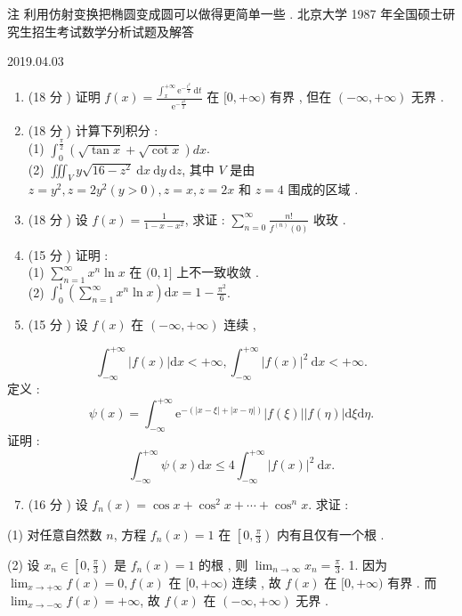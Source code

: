 \documentclass[10pt]{article}
\begin{document}
 注   利用仿射变换把椭圆变成圆可以做得更简单一些 .  北京大学  1987  年全国硕士研究生招生考试数学分析试题及解答 

   

2019.04.03

\begin{enumerate}
  \item (18  分 )  证明  $f(x)=\frac{\int_{x}^{+\infty} \mathrm{e}^{-\frac{t^{2}}{2}} \mathrm{~d} t}{\mathrm{e}^{-\frac{x^{2}}{2}}}$  在  $[0,+\infty)$  有界 ,  但在  $(-\infty,+\infty)$  无界 .

  \item (18  分 )  计算下列积分 :\\
(1) $\int_{0}^{\frac{\pi}{2}}(\sqrt{\tan x}+\sqrt{\cot x}) d x$.\\
(2) $\iiint_{V} y \sqrt{16-z^{2}} \mathrm{~d} x \mathrm{~d} y \mathrm{~d} z$,  其中  $V$  是由  $z=y^{2}, z=2 y^{2}(y>0), z=x, z=2 x$  和  $z=4$  围成的区域 .

  \item (18  分 )  设  $f(x)=\frac{1}{1-x-x^{2}}$,  求证 : $\sum_{n=0}^{\infty} \frac{n !}{f^{(n)}(0)}$  收玫 .

  \item (15  分 )  证明 :\\
(1) $\sum_{n=1}^{\infty} x^{n} \ln x$  在  $(0,1]$  上不一致收敛 .\\
(2) $\int_{0}^{1}\left(\sum_{n=1}^{\infty} x^{n} \ln x\right) \mathrm{d} x=1-\frac{\pi^{2}}{6}$.

  \item (15  分 )  设  $f(x)$  在  $(-\infty,+\infty)$  连续 ,

\end{enumerate}
$$
\int_{-\infty}^{+\infty}|f(x)| \mathrm{d} x<+\infty, \int_{-\infty}^{+\infty}|f(x)|^{2} \mathrm{~d} x<+\infty .
$$
 定义 :
$$
\psi(x)=\int_{-\infty}^{+\infty} \mathrm{e}^{-(|x-\xi|+|x-\eta|)}|f(\xi)||f(\eta)| \mathrm{d} \xi \mathrm{d} \eta .
$$
 证明 :
$$
\int_{-\infty}^{+\infty} \psi(x) \mathrm{d} x \leq 4 \int_{-\infty}^{+\infty}|f(x)|^{2} \mathrm{~d} x .
$$

\begin{enumerate}
  \setcounter{enumi}{6}
  \item (16  分 )  设  $f_{n}(x)=\cos x+\cos ^{2} x+\cdots+\cos ^{n} x$.  求证 :
\end{enumerate}
(1)  对任意自然数  $n$,  方程  $f_{n}(x)=1$  在  $\left[0, \frac{\pi}{3}\right)$  内有且仅有一个根 .

(2)  设  $x_{n} \in\left[0, \frac{\pi}{3}\right)$  是  $f_{n}(x)=1$  的根 ,  则  $\lim _{n \rightarrow \infty} x_{n}=\frac{\pi}{3}$. 1.  因为  $\lim _{x \rightarrow+\infty} f(x)=0, f(x)$  在  $[0,+\infty)$  连续 ,  故  $f(x)$  在  $[0,+\infty)$  有界 .  而  $\lim _{x \rightarrow-\infty} f(x)=+\infty$,  故  $f(x)$  在  $(-\infty,+\infty)$  无界 .
\end{document}
